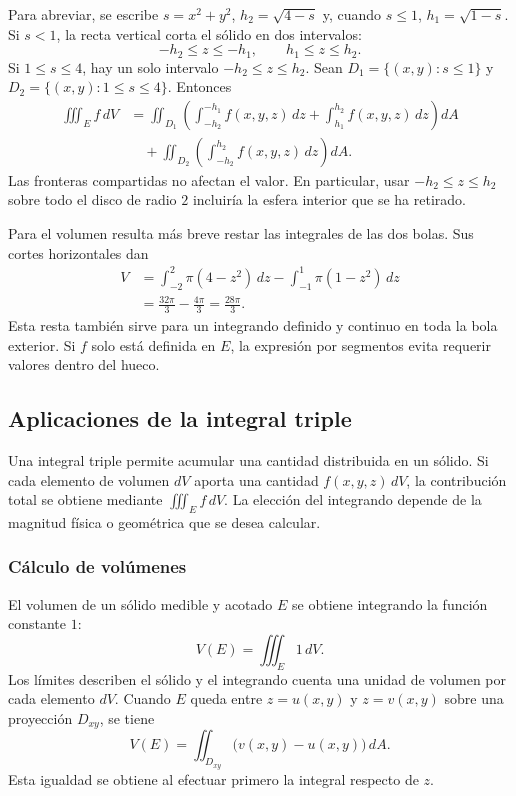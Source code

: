 Para abreviar, se escribe $s=x^2+y^2$, $h_2=\sqrt{4-s}$ y, cuando $s\leq1$, $h_1=\sqrt{1-s}$. Si $s<1$, la recta vertical corta el sólido en dos intervalos:
\[
-h_2\leq z\leq-h_1,\qquad h_1\leq z\leq h_2.
\]
Si $1\leq s\leq4$, hay un solo intervalo $-h_2\leq z\leq h_2$. Sean $D_1=\{(x,y):s\leq1\}$ y $D_2=\{(x,y):1\leq s\leq4\}$. Entonces
\begin{align*}
\iiint_E f\,dV
&=\iint_{D_1}\left(\int_{-h_2}^{-h_1} f(x,y,z)\,dz
+\int_{h_1}^{h_2} f(x,y,z)\,dz\right)dA\\
&\quad+\iint_{D_2}\left(\int_{-h_2}^{h_2}f(x,y,z)\,dz\right)dA.
\end{align*}
Las fronteras compartidas no afectan el valor. En particular, usar $-h_2\leq z\leq h_2$ sobre todo el disco de radio $2$ incluiría la esfera interior que se ha retirado.

Para el volumen resulta más breve restar las integrales de las dos bolas. Sus cortes horizontales dan
\begin{align*}
V&=\int_{-2}^{2}\pi(4-z^2)\,dz
-\int_{-1}^{1}\pi(1-z^2)\,dz\\
&=\frac{32\pi}{3}-\frac{4\pi}{3}=\frac{28\pi}{3}.
\end{align*}
Esta resta también sirve para un integrando definido y continuo en toda la bola exterior. Si $f$ solo está definida en $E$, la expresión por segmentos evita requerir valores dentro del hueco.

\subsection{Aplicaciones de la integral triple}

Una integral triple permite acumular una cantidad distribuida en un sólido. Si cada elemento de volumen $dV$ aporta una cantidad $f(x,y,z)\,dV$, la contribución total se obtiene mediante $\iiint_E f\,dV$. La elección del integrando depende de la magnitud física o geométrica que se desea calcular.

\subsubsection{Cálculo de volúmenes}

El volumen de un sólido medible y acotado $E$ se obtiene integrando la función constante $1$:
\[
V(E)=\iiint_E 1\,dV.
\]
Los límites describen el sólido y el integrando cuenta una unidad de volumen por cada elemento $dV$. Cuando $E$ queda entre $z=u(x,y)$ y $z=v(x,y)$ sobre una proyección $D_{xy}$, se tiene
\[
V(E)=\iint_{D_{xy}}\bigl(v(x,y)-u(x,y)\bigr)\,dA.
\]
Esta igualdad se obtiene al efectuar primero la integral respecto de $z$.

